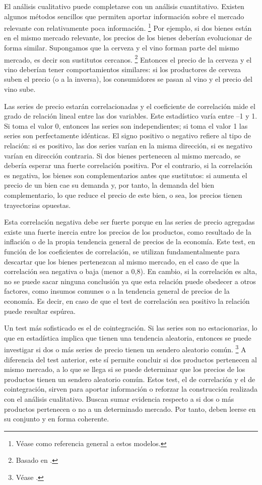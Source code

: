 \documentclass[
  12pt,
  spanish,
]{book}
\begin{document}
El análisis cualitativo puede completarse con un análisis cuantitativo. Existen algunos métodos sencillos que permiten aportar información sobre el mercado relevante con relativamente poca información.
\footnote{Véase \citet{Haldrup2003} como referencia general a estos modelos.}
Por ejemplo, si dos bienes están en el mismo mercado relevante, los precios de los bienes deberían evolucionar de forma similar. Supongamos que la cerveza y el vino forman parte del mismo mercado, es decir son sustitutos cercanos.
\footnote{Basado en \citet{Zipitria2010}.}
Entonces el precio de la cerveza y el vino deberían tener comportamientos similares: si los productores de cerveza suben el precio (o a la inversa), los consumidores se pasan al vino y el precio del vino sube.

Las series de precio estarán correlacionadas y el coeficiente de correlación mide el grado de relación lineal entre las dos variables. Este estadístico varía entre --1 y 1. Si toma el valor 0, entonces las series son independientes; si toma el valor 1 las series son perfectamente idénticas. El signo positivo o negativo refiere al tipo de relación: si es positivo, las dos series varían en la misma dirección, si es negativo varían en dirección contraria. Si dos bienes pertenecen al mismo mercado, se debería esperar una fuerte correlación positiva. Por el contrario, si la correlación es negativa, los bienes son complementarios antes que sustitutos: si aumenta el precio de un bien cae su demanda y, por tanto, la demanda del bien complementario, lo que reduce el precio de este bien, o sea, los precios tienen trayectorias opuestas.

Esta correlación negativa debe ser fuerte porque en las series de precio agregadas existe una fuerte inercia entre los precios de los productos, como resultado de la inflación o de la propia tendencia general de precios de la economía. Este test, en función de los coeficientes de correlación, se utilizan fundamentalmente para descartar que los bienes pertenezcan al mismo mercado, en el caso de que la correlación sea negativa o baja (menor a 0,8). En cambio, si la correlación es alta, no se puede sacar ninguna conclusión ya que esta relación puede obedecer a otros factores, como insumos comunes o a la tendencia general de precios de la economía. Es decir, en caso de que el test de correlación sea positivo la relación puede resultar espúrea.

Un test más sofisticado es el de cointegración. Si las series son no estacionarias, lo que en estadística implica que tienen una tendencia aleatoria, entonces se puede investigar si dos o más series de precio tienen un sendero aleatorio común.
\footnote{Véase \citet{Haldrup2003}.}
A diferencia del test anterior, este sí permite concluir si dos productos pertenecen al mismo mercado, a lo que se llega si se puede determinar que los precios de los productos tienen un sendero aleatorio común. Estos test, el de correlación y el de cointegración, sirven para aportar información o reforzar la construcción realizada con el análisis cualitativo. Buscan sumar evidencia respecto a si dos o más productos pertenecen o no a un determinado mercado. Por tanto, deben leerse en su conjunto y en forma coherente.
\end{document}
